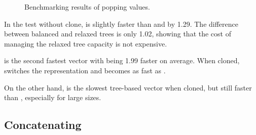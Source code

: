 \begin{figure}[!htbp]
    \caption{Benchmarking results of popping values.}
    \label{fig:pop}
\end{figure}

In the test without clone, \imrsvec{} is slightly faster than \rbvec{} and \rrbvec{} by 1.29. The difference between balanced and relaxed trees is only 1.02, showing that the cost of managing the relaxed tree capacity is not expensive.

\pvec{} is the second fastest vector with \stdvec{} being 1.99 faster on average. When cloned, \pvec{} switches the representation and becomes as fast as \rbvec{}. 

On the other hand, \imrsvec{} is the slowest tree-based vector when cloned, but still faster than \stdvec{}, especially for large sizes.

\subsection{Concatenating}

